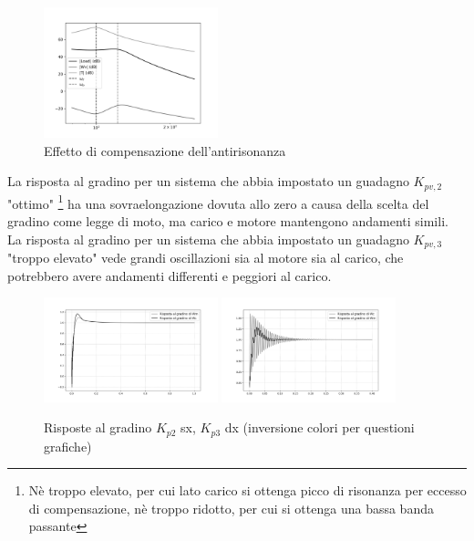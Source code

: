\begin{figure}[h]
    \centering
    \includegraphics[width=0.45\textwidth]{Immagini/colocato_v_lato_carico.png}
    \caption{Effetto di compensazione dell'antirisonanza}
\end{figure}

La risposta al gradino per un sistema che abbia impostato un guadagno \(K_{pv,2}\) "ottimo" \footnote{Nè troppo elevato, per cui lato carico si ottenga picco di risonanza per eccesso di compensazione, nè troppo ridotto, per cui si ottenga una bassa banda passante} ha una sovraelongazione dovuta allo zero a causa della scelta del gradino come legge di moto, ma carico e motore mantengono andamenti simili.
La risposta al gradino per un sistema che abbia impostato un guadagno \(K_{pv,3}\) "troppo elevato" vede grandi oscillazioni sia al motore sia al carico, che potrebbero avere andamenti differenti e peggiori al carico.

\begin{figure}[h]
    \centering
    \includegraphics[width=0.45\textwidth]{Immagini/step_response_Kp2.png}
    \includegraphics[width=0.45\textwidth]{Immagini/step_response_Kp3.png}
    \caption{Risposte al gradino \(K_{p2}\) sx, \(K_{p3}\) dx (inversione colori per questioni grafiche)}
\end{figure}

